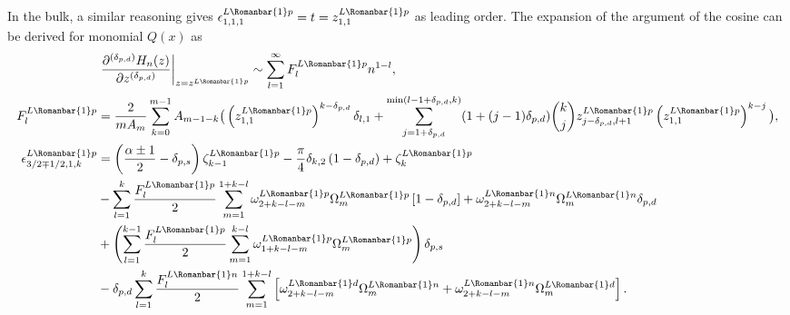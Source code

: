 \documentclass[11pt]{article}
\newcommand*{\todo}[1]{{\color{red}?? TODO: #1 ??}}
\newcommand{\ql}{L}
\newcommand{\rb}{{\scriptsize \Romanbar{1}} }
\newcommand{\pg}{p}
\newcommand{\pn}{n}
\newcommand{\pd}{d}
\newcommand{\ps}{s}
\numberwithin{equation}{section}
\begin{document}
In the bulk, a similar reasoning gives $\epsilon_{1,1,1}^{\ql\rb\pg} = t = z_{1,1}^{\ql\rb\pg}$ as leading order. The expansion of the argument of the cosine can be derived for monomial $Q(x)$ as 
\begin{align} 
	& \left. \frac{\partial^{(\delta_{\pg,\pd})} H_n(z) }{\partial z^{(\delta_{\pg,\pd})} } \right|_{z=z^{\ql\rb\pg}}  \sim \sum_{l=1}^\infty F_l^{\ql\rb\pg} n^{1-l}, \\ %
	F_l^{\ql\rb\pg} & = \frac{2}{mA_m}\sum_{k=0}^{m-1} A_{m-1-k} \big( \left(z_{1,1}^{\ql\rb\pg}\right)^{k-\delta_{\pg,\pd}} \delta_{l,1} + \sum_{j=1+\delta_{\pg,\pd}}^{\min(l-1+\delta_{\pg,\pd},k)} (1 + (j-1)\delta_{\pg,\pd} ) {k \choose j} z_{j-\delta_{\pg,\pd},l+1}^{\ql\rb\pg} \left(z_{1,1}^{\ql\rb\pg}\right)^{k-j} \big), \\ %
	\epsilon_{3/2 \mp 1/2, 1, k}^{\ql\rb\pg} & = \left(\frac{\alpha \pm 1}{2} -\delta_{\pg,\ps} \right) \zeta_{k-1}^{\ql\rb\pg} -\frac{\pi}{4}\delta_{k,2}\left(1-\delta_{\pg, \pd}\right)  +\zeta_{k}^{\ql\rb\pg} \\ %
	& - \sum_{l=1}^{k} \frac{F_l^{\ql\rb\pg}}{2} \sum_{m=1}^{1+k-l} \omega_{2+k-l-m}^{\ql\rb\pg} \Omega_m^{\ql\rb\pg} \left[1-\delta_{\pg,\pd}\right] + \omega_{2+k-l-m}^{\ql\rb\pn} \Omega_m^{\ql\rb\pn} \delta_{\pg,\pd}   \\
	& + \left( \sum_{l=1}^{k-1} \frac{F_l^{\ql\rb\pg}}{2} \sum_{m=1}^{k-l} \omega_{1+k-l-m}^{\ql\rb\pg} \Omega_m^{\ql\rb\pg} \right)\delta_{\pg,\ps} \\
	& - \delta_{\pg,\pd} \sum_{l=1}^{k} \frac{F_l^{\ql\rb\pn} }{2} \sum_{m=1}^{1+k-l} \left[ \omega_{2+k-l-m}^{\ql\rb\pd} \Omega_m^{\ql\rb\pn} + \omega_{2+k-l-m}^{\ql\rb\pn} \Omega_m^{\ql\rb\pd} \right].
\end{align}
\end{document}
